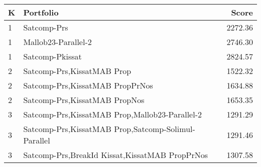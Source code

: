 \begin{tabular}{l|p{.9\linewidth}|r}
\toprule
K & Portfolio & Score \\
\midrule
1 & Satcomp-Prs & 2272.36 \\
1 & Mallob23-Parallel-2 & 2746.30 \\
1 & Satcomp-Pkissat & 2824.57 \\
2 & Satcomp-Prs,KissatMAB Prop & 1522.32 \\
2 & Satcomp-Prs,KissatMAB PropPrNos & 1634.88 \\
2 & Satcomp-Prs,KissatMAB PropNos & 1653.35 \\
3 & Satcomp-Prs,KissatMAB Prop,Mallob23-Parallel-2 & 1291.29 \\
3 & Satcomp-Prs,KissatMAB Prop,Satcomp-Solimul-Parallel & 1291.46 \\
3 & Satcomp-Prs,BreakId Kissat,KissatMAB PropPrNos & 1307.58 \\
\bottomrule
\end{tabular}

